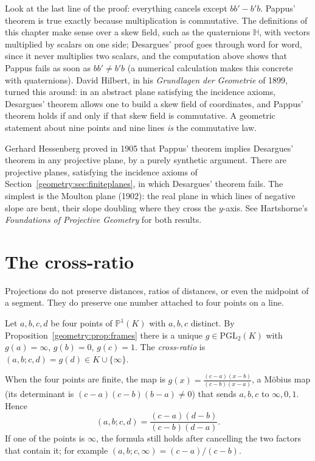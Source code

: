 \begin{beauty}
Look at the last line of the proof: everything cancels except $bb'-b'b$. Pappus' theorem is true exactly because multiplication is commutative.
The definitions of this chapter make sense over a skew field, such as the quaternions $\mathbb H$, with vectors multiplied by scalars on one
side; Desargues' proof goes through word for word, since it never multiplies two scalars, and the computation above shows that Pappus fails
as soon as $bb'\ne b'b$ (a numerical calculation makes this concrete with quaternions). David Hilbert, in his \emph{Grundlagen der
Geometrie} of 1899, turned this around: in an abstract plane satisfying the incidence axioms, Desargues' theorem allows one to build a skew field
of coordinates, and Pappus' theorem holds if and only if that skew field is commutative. A geometric statement about nine points and nine lines
\emph{is} the commutative law.
\end{beauty}

\begin{remark}
Gerhard Hessenberg proved in 1905 that Pappus' theorem implies Desargues' theorem in any projective plane, by a purely synthetic argument.
There are projective planes, satisfying the incidence axioms of Section~\ref{geometry:sec:finiteplanes}, in which Desargues' theorem fails. The simplest is
the Moulton plane (1902): the real plane in which lines of negative slope are bent, their slope doubling where they cross the $y$-axis. See
Hartshorne's \emph{Foundations of Projective Geometry} for both results.
\end{remark}

\section{The cross-ratio}

Projections do not preserve distances, ratios of distances, or even the midpoint of a segment. They do preserve one number attached to four
points on a line.

\begin{definition}\label{geometry:def:crossratio}
Let $a,b,c,d$ be four points of $\mathbb P^1(K)$ with $a,b,c$ distinct. By Proposition~\ref{geometry:prop:frames} there is a unique $g\in\mathrm{PGL}_2(K)$
with $g(a)=\infty$, $g(b)=0$, $g(c)=1$. The \emph{cross-ratio} is $(a,b;c,d)=g(d)\in K\cup\{\infty\}$.
\end{definition}

When the four points are finite, the map is $g(x)=\frac{(c-a)(x-b)}{(c-b)(x-a)}$, a M\"obius map (its determinant is $(c-a)(c-b)(b-a)\ne0$) that
sends $a,b,c$ to $\infty,0,1$. Hence
\begin{equation}\label{geometry:eq:crossratio}
(a,b;c,d)=\frac{(c-a)(d-b)}{(c-b)(d-a)}.
\end{equation}
If one of the points is $\infty$, the formula still holds after cancelling the two factors that contain it; for example $(a,b;c,\infty)=(c-a)/(c-b)$.

